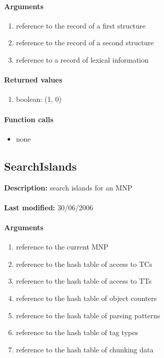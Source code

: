\paragraph{Arguments}
\begin{enumerate}
\item reference to the record of a first structure
\item reference to the record of a second structure
\item reference to a record of lexical information
\end{enumerate}

\paragraph{Returned values}
\begin{enumerate}
\item boolean: (1, 0)
\end{enumerate}

\paragraph{Function calls}
\begin{itemize}
\item none
\end{itemize}

\subsection{SearchIslands}
\textbf{Description:} search islands for an MNP\\
\\\textbf{Last modified:} 30/06/2006

\paragraph{Arguments}
\begin{enumerate}
\item reference to the current MNP
\item reference to the hash table of access to TCs
\item reference to the hash table of access to TTs
\item reference to the hash table of object counters
\item reference to the hash table of parsing patterns
\item reference to the hash table of tag types
\item reference to the hash table of chunking data
\end{enumerate}

